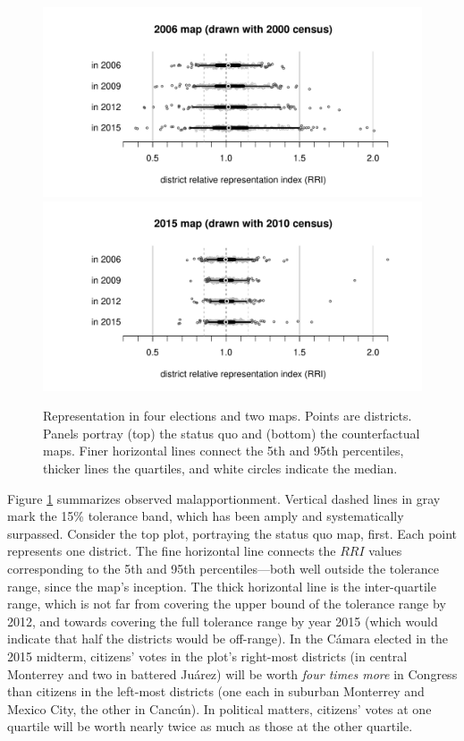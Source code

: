 \documentclass[letter,12pt]{article}
\begin{document}
{%
\begin{figure}
\begin{center}
    \includegraphics[width=.65\columnwidth]{rrin0615d0.pdf} \\
    \includegraphics[width=.65\columnwidth]{rrin0615d3.pdf} \\
\caption{Representation in four elections and two maps. Points are districts. Panels portray (top) the status quo and (bottom) the counterfactual maps. Finer horizontal lines connect the 5th and 95th percentiles, thicker lines the quartiles, and white circles indicate the median.}\label{F:malapp}
\end{center}
\end{figure}

Figure \ref{F:malapp} summarizes observed malapportionment. Vertical dashed lines in gray mark the 15\% tolerance band, which has been amply and systematically surpassed. Consider the top plot, portraying the status quo map, first. Each point represents one district. The fine horizontal line connects the $RRI$ values corresponding to the 5th and 95th percentiles---both well outside the tolerance range, since the map's inception. The thick horizontal line is the inter-quartile range, which is not far from covering the upper bound of the tolerance range by 2012, and towards covering the full tolerance range by year 2015 (which would indicate that half the districts would be off-range). In the C\'amara elected in the 2015 midterm, citizens' votes in the plot's right-most districts (in central Monterrey and two in battered Ju\'arez) will be worth \emph{four times more} in Congress than citizens in the left-most districts (one each in suburban Monterrey and Mexico City, the other in Canc\'un). In political matters, citizens' votes at one quartile will be worth nearly twice as much as those at the other quartile. 

}
\end{document}
